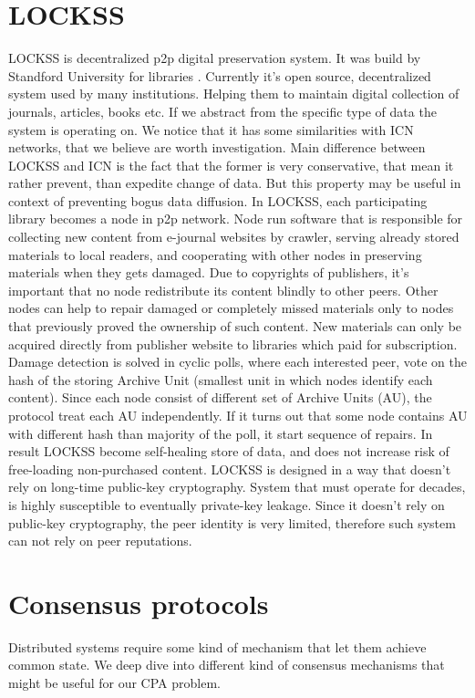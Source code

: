 \documentclass[nostrict]{szablonPG}
\begin{document}
\section{LOCKSS}
LOCKSS is decentralized p2p digital preservation system. It was build by Standford University for libraries \cite{maniatis2003preserving}. Currently it's open source, decentralized system used by many institutions. Helping them to maintain digital collection of journals, articles, books etc. If we abstract from the specific type of data the system is operating on. We notice that it has some similarities with ICN networks, that we believe are worth investigation. Main difference between LOCKSS and ICN is the fact that the former is very conservative, that mean it rather prevent, than expedite change of data. But this property may be useful in context of preventing bogus data diffusion. 
In LOCKSS, each participating library becomes a node in p2p network. Node run software that is responsible for collecting new content from e-journal websites by crawler, serving already stored materials to local readers, and cooperating with other nodes in preserving materials when they gets damaged. 
Due to copyrights of publishers, it's important that no node redistribute its content blindly to other peers. Other nodes can help to repair damaged or completely missed materials only to nodes that previously proved the ownership of such content. New materials can only be acquired directly from publisher website to libraries which paid for subscription. 
Damage detection is solved in cyclic polls, where each interested peer, vote on the hash of the storing Archive Unit (smallest unit in which nodes identify each content). Since each node consist of different set of Archive Units (AU), the protocol treat each AU independently. If it turns out that some node contains AU with different hash than majority of the poll, it start sequence of repairs. In result LOCKSS become self-healing store of data, and does not increase risk of free-loading non-purchased content.
LOCKSS is designed in a way that doesn't rely on long-time public-key cryptography. System that must operate for decades, is highly susceptible to eventually private-key leakage. Since it doesn't rely on public-key cryptography, the peer identity is very limited, therefore such system can not rely on peer reputations.

\section{Consensus protocols}
Distributed systems require some kind of mechanism that let them achieve common state. We deep dive into different kind of consensus mechanisms that might be useful for our CPA problem.
\end{document}
